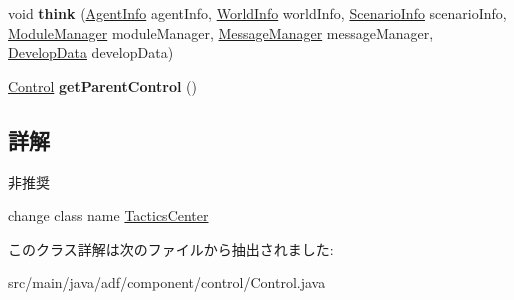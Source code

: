 \begin{DoxyCompactItemize}
\item 
\hypertarget{classadf_1_1component_1_1control_1_1Control_ad8d7e05c1d5e6ac44e50c79a3ab14706}{}\label{classadf_1_1component_1_1control_1_1Control_ad8d7e05c1d5e6ac44e50c79a3ab14706} 
void {\bfseries think} (\hyperlink{classadf_1_1agent_1_1info_1_1AgentInfo}{Agent\+Info} agent\+Info, \hyperlink{classadf_1_1agent_1_1info_1_1WorldInfo}{World\+Info} world\+Info, \hyperlink{classadf_1_1agent_1_1info_1_1ScenarioInfo}{Scenario\+Info} scenario\+Info, \hyperlink{classadf_1_1agent_1_1module_1_1ModuleManager}{Module\+Manager} module\+Manager, \hyperlink{classadf_1_1agent_1_1communication_1_1MessageManager}{Message\+Manager} message\+Manager, \hyperlink{classadf_1_1agent_1_1develop_1_1DevelopData}{Develop\+Data} develop\+Data)
\item 
\hypertarget{classadf_1_1component_1_1control_1_1Control_adccbe65c8b9e73ebb17d8dd53273f41d}{}\label{classadf_1_1component_1_1control_1_1Control_adccbe65c8b9e73ebb17d8dd53273f41d} 
\hyperlink{classadf_1_1component_1_1control_1_1Control}{Control} {\bfseries get\+Parent\+Control} ()
\end{DoxyCompactItemize}


\subsection{詳解}
\begin{DoxyRefDesc}{非推奨}
\item[\hyperlink{deprecated__deprecated000009}{非推奨}]change class name \hyperlink{}{Tactics\+Center} \end{DoxyRefDesc}


このクラス詳解は次のファイルから抽出されました\+:\begin{DoxyCompactItemize}
\item 
src/main/java/adf/component/control/Control.\+java\end{DoxyCompactItemize}
